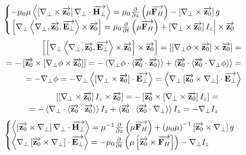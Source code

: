 %
\textcolor{blue}{ \begin{equation*} \begin{aligned}
\begin{cases} 
- \mu_0 \mu \dotprod{\crossprod{\nabla_\perp}{\vect{z_0}} \nabla_\perp}
{\vect{H_\perp}} = \mu_0 \partder{}{z} \left( \mu \vect{F_H} \right) -
\crossprod{\nabla_\perp}{\vect{z_0}} g \\
\left. \crossprod{\nabla_\perp 
\triple{\nabla_\perp}{\vect{z_0}}{\vect{E_\perp}}
}{\vect{z_0}} = \mu_0 \partder{}{t} \left( \mu \vect{F_H} \right) +
\crossprod{\nabla_\perp}{\vect{z_0}} I_z \right| \times \vect{z_0}
\end{cases}
\end{aligned} \end{equation*} }
%
\textcolor{blue}{ \begin{equation*} \begin{aligned}
\crossprod{ \crossprod
{\nabla_\perp \triple{\nabla_\perp}{\vect{z_0}}{\vect{E_\perp}}}
{\vect{z_0}} }{ \vect{z_0} } = \crossprod{ \crossprod{\nabla_\perp \phi}
{\vect{z_0}} }{\vect{z_0}} = \\ = - \crossprod{ \vect{z_0} }{ 
\crossprod{\nabla_\perp \phi}{\vect{z_0}} } = - \dotprod{\nabla_\perp \phi}
{ \dotprod{\vect{z_0}}{\vect{z_0}} } + \dotprod{\vect{z_0}}
{ \dotprod{\vect{z_0}}{\nabla_\perp \phi} } = \\ = - \nabla_\perp \phi = 
- \nabla_\perp 
\dotprod{\crossprod{\nabla_\perp}{\vect{z_0}}}{\vect{E_\perp}} = 
\dotprod{\nabla_\perp \crossprod{\vect{z_0}}{\nabla_\perp}}{\vect{E_\perp}}
\end{aligned} \end{equation*} }
%
\textcolor{blue}{ \begin{equation*} \begin{aligned}
\crossprod {\crossprod{\nabla_\perp}{\vect{z_0}} I_z}{\vect{z_0}} = 
- \crossprod {\vect{z_0}}{\crossprod{\nabla_\perp}{\vect{z_0}} I_z} = \\
= - \dotprod{{\nabla_\perp}}{\dotprod{\vect{z_0}}{\vect{z_0}}} I_z + 
\dotprod{\vect{z_0}}{\dotprod{\vect{z_0}}{{\nabla_\perp}}} I_z = 
- \nabla_\perp I_z 
\end{aligned} \end{equation*} }
%
\textcolor{blue}{ \begin{equation*} \begin{aligned}
\begin{cases} 
\dotprod{\crossprod{\vect{z_0}}{\nabla_\perp} \nabla_\perp} {\vect{H_\perp}} = 
\mu^{-1} \partder{}{z} \left( \mu \vect{F_H} \right) +
\left( \mu_0 \mu \right)^{-1} \crossprod{\vect{z_0}}{\nabla_\perp} g \\
\dotprod{\nabla_\perp \crossprod{\vect{z_0}}{\nabla_\perp}}{\vect{E_\perp}}
= - \mu_0 \partder{}{t} \left( \mu \crossprod{\vect{z_0}}{\vect{F_H}} \right) -
\nabla_\perp I_z 
\end{cases}
\end{aligned} \end{equation*} }
